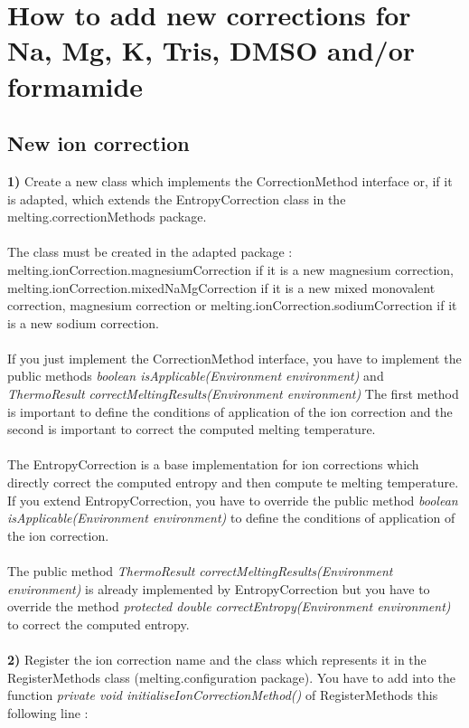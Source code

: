 \documentclass{article}
\begin{document}
\section{How to add new corrections for Na, Mg, K, Tris, DMSO and/or formamide}

\subsection{New ion correction}

\textbf{1)} Create a new class which implements the CorrectionMethod interface or, if it is adapted, which
extends the EntropyCorrection class in the melting.correctionMethods package. \\
\\
The class must be created in the adapted package : 
melting.ionCorrection.magnesiumCorrection if it is a new magnesium correction, 
melting.ionCorrection.mixedNaMgCorrection if it is a new mixed monovalent correction, 
magnesium correction or 
melting.ionCorrection.sodiumCorrection if it is a new sodium correction.\\
\\

If you just implement the CorrectionMethod interface, you have to implement the public methods 
\textit{boolean isApplicable(Environment environment)} and \textit{ThermoResult correctMeltingResults(Environment environment)}
The first method is important to define the conditions of application of the ion correction and the 
second is important to correct the computed melting temperature.\\
\\

The EntropyCorrection is a base implementation for ion corrections which directly correct the 
computed entropy and then compute te melting temperature. If you extend EntropyCorrection, you have to
override the public method \textit{boolean isApplicable(Environment environment)} to define the conditions
of application of the ion correction.\\
\\
The public method \textit{ThermoResult correctMeltingResults(Environment environment)} is already implemented
by EntropyCorrection but you have to override the method \textit{protected double correctEntropy(Environment environment)}
to correct the computed entropy.\\
\\

\textbf{2)} Register the ion correction name and the class which represents it in the RegisterMethods
class (melting.configuration package). 
You have to add into the function \textit{private void initialiseIonCorrectionMethod()} of RegisterMethods
this following line :
\end{document}
